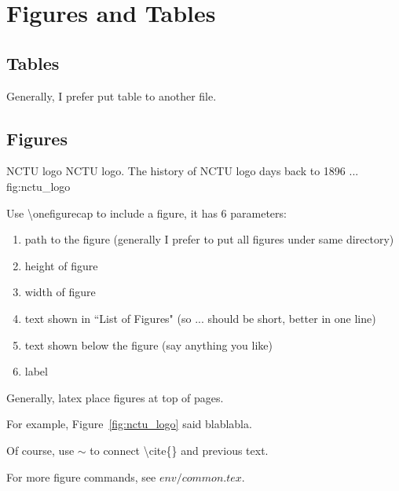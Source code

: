 \chapter{Figures and Tables}

\section{Tables}

Generally, I prefer put table to another file.



\section{Figures}

{NCTU logo}
{NCTU logo. The history of NCTU logo days back to 1896 ...}
{fig:nctu_logo}

Use \textbackslash onefigurecap to include a figure, it has 6 parameters:
\begin{enumerate}
\item path to the figure (generally I prefer to put all figures under same directory)
\item height of figure
\item width of figure
\item text shown in ``List of Figures" (so ... should be short, better in one line)
\item text shown below the figure (say anything you like)
\item label
\end{enumerate}

Generally, latex place figures at top of pages.

For example, Figure~\ref{fig:nctu_logo} said blablabla.

Of course, use $\sim$ to connect \textbackslash cite\{\} and previous text.

For more figure commands, see $env/common.tex$.

